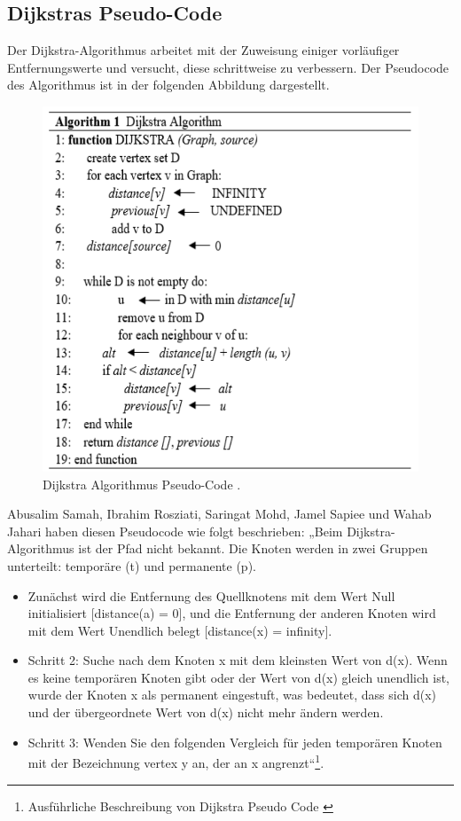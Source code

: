 \subsection{Dijkstras Pseudo-Code}

Der Dijkstra-Algorithmus arbeitet mit der Zuweisung einiger vorläufiger Entfernungswerte und versucht, diese schrittweise zu verbessern. Der Pseudocode des Algorithmus ist in der folgenden Abbildung dargestellt\cite{Huang2012}.
 \begin{figure}[H]
	\centering
	\includegraphics[width=1.0\textwidth]{images/Dijkstra_pseudoCode.PNG}
	\caption{\label{fig:Dijkstra}Dijkstra Algorithmus Pseudo-Code \cite{Abusalim2020}.}
\end{figure}

Abusalim Samah, Ibrahim Rosziati, Saringat Mohd, Jamel Sapiee und Wahab Jahari haben  diesen Pseudocode wie folgt beschrieben:
\newline
\newline
 „Beim Dijkstra-Algorithmus ist der Pfad nicht bekannt. Die Knoten werden in zwei Gruppen unterteilt: temporäre (t) und permanente (p).
\begin{itemize}
	\item  Zunächst wird die Entfernung des Quellknotens mit dem Wert Null initialisiert [distance(a) = 0], und die Entfernung der anderen Knoten wird mit dem Wert Unendlich belegt [distance(x) = infinity]. 
	\item Schritt 2: Suche nach dem Knoten x mit dem kleinsten Wert von d(x). Wenn es keine temporären Knoten gibt oder der Wert von d(x) gleich unendlich ist, wurde der Knoten x als permanent eingestuft, was bedeutet, dass sich d(x) und der übergeordnete Wert von d(x) nicht mehr ändern werden. 
	\item Schritt 3: Wenden Sie den folgenden Vergleich für jeden temporären Knoten mit der Bezeichnung vertex y an, der an x angrenzt“\footnote{Ausführliche Beschreibung von Dijkstra Pseudo Code \cite{Abusalim2020}}.
\end{itemize}


